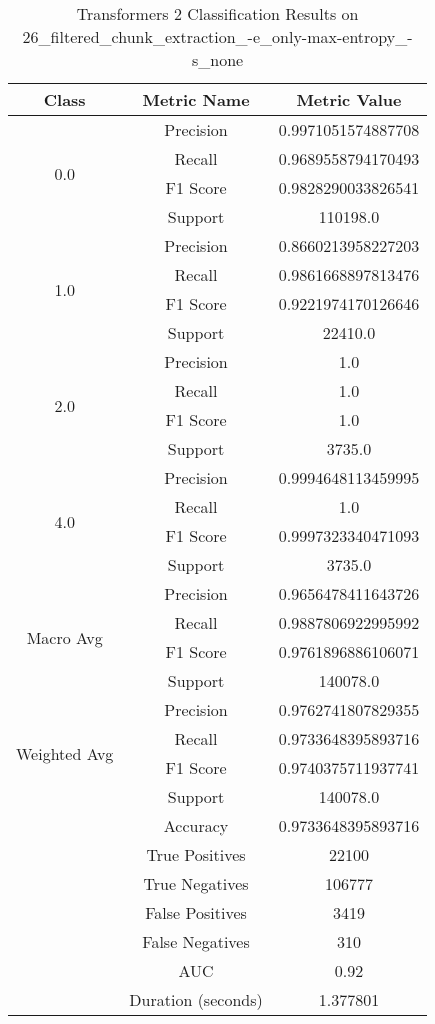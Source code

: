     
    \begin{longtable}{|c|c|c|}
    \caption{Transformers 2 Classification Results on 26\_filtered\_chunk\_extraction\_-e\_only-max-entropy\_-s\_none} \label{tab:transformers_2_classifiers_results} \\
    \hline
    Class & Metric Name & Metric Value \\
    \hline
    \multirow{4}{*}{0.0} & Precision & 0.9971051574887708 \\
     & Recall & 0.9689558794170493 \\
     & F1 Score & 0.9828290033826541 \\
     & Support & 110198.0 \\
    \hline
    \multirow{4}{*}{1.0} & Precision & 0.8660213958227203 \\
     & Recall & 0.9861668897813476 \\
     & F1 Score & 0.9221974170126646 \\
     & Support & 22410.0 \\
    \hline
    \multirow{4}{*}{2.0} & Precision & 1.0 \\
     & Recall & 1.0 \\
     & F1 Score & 1.0 \\
     & Support & 3735.0 \\
    \hline
    \multirow{4}{*}{4.0} & Precision & 0.9994648113459995 \\
     & Recall & 1.0 \\
     & F1 Score & 0.9997323340471093 \\
     & Support & 3735.0 \\
    \hline
    \multirow{4}{*}{Macro Avg} & Precision & 0.9656478411643726 \\
     & Recall & 0.9887806922995992 \\
     & F1 Score & 0.9761896886106071 \\
     & Support & 140078.0 \\
    \hline
    \multirow{4}{*}{Weighted Avg} & Precision & 0.9762741807829355 \\
     & Recall & 0.9733648395893716 \\
     & F1 Score & 0.9740375711937741 \\
     & Support & 140078.0 \\
    \hline
    & Accuracy & 0.9733648395893716 \\ \hline
    & True Positives & 22100 \\ \hline
    & True Negatives & 106777 \\ \hline
    & False Positives & 3419 \\ \hline
    & False Negatives & 310 \\ \hline
    & AUC & 0.92 \\ \hline
    & Duration (seconds) & 1.377801 \\ \hline
    \end{longtable}
    
